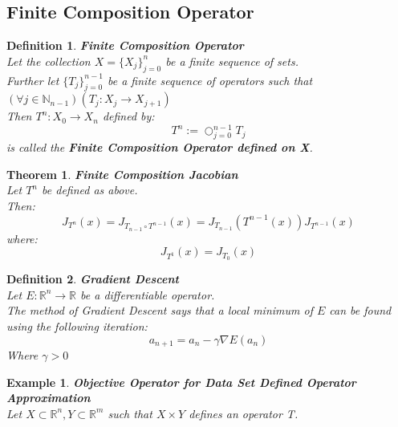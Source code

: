 \documentclass[12pt]{extarticle}
\theoremstyle{plain}
\newtheorem{thm}{Theorem}[section]
\theoremstyle{Definition}
\newtheorem{def.}{Definition}[section]
\theoremstyle{Definition}
\theoremstyle{plain}
\newtheorem{exmp}{Example}[section]
\begin{document}
\subsection{Finite Composition Operator}
\begin{def.} \textbf{Finite Composition Operator} \\ 
	Let the collection $X = \{X_j\}_{j=0}^{n}$ be a finite sequence of sets. \\ 
	Further let $\{T_j\}_{j=0}^{n-1}$ be a finite sequence of operators such that $(\forall j \in \mathbb{N}_{n-1})(T_j : X_j \to X_{j+1})$ \\ 
	Then $T^n : X_0 \to X_{n}$ defined by: 
	$$T^n := \bigcirc_{j=0}^{n-1} T_j$$ 
	is called the \textbf{Finite Composition Operator defined on X}. \\ 
\end{def.}

\begin{thm} \textbf{Finite Composition Jacobian} \\ 
	Let $T^n$ be defined as above. \\ 
	Then: 
	$$J_{T^n}(x) = J_{T_{n-1} \circ T^{n-1}}(x) = J_{T_{n-1}}(T^{n-1}(x))J_{T^{n-1}}(x) $$
	where: 
	$$J_{T^1}(x) = J_{T_0}(x)$$	

\end{thm}

\begin{def.} \textbf{Gradient Descent} \\ 
Let $E : \mathbb{R}^n \to \mathbb{R}$ be a differentiable operator. \\ 
The method of Gradient Descent says that a local minimum of $E$ can be found using the following iteration: \\ 
$$a_{n+1} = a_n - \gamma \nabla E(a_n)$$
Where $\gamma > 0$ \\ 
\end{def.}

\begin{exmp} \textbf{Objective Operator for Data Set Defined Operator Approximation} \\ 		
Let $X \subset \mathbb{R}^n, Y \subset \mathbb{R}^m$ such that $X\times Y$ defines an operator T. \\ 
		
		
		
\end{exmp}

\newpage
\end{document}
